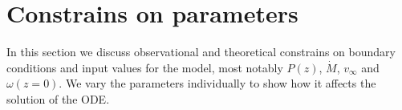 \section{Constrains on parameters}
\label{sect:parameters}
In this section we discuss observational and theoretical constrains on boundary conditions and input values for the model, most notably $P(z)$, $\dot M$, $v_\infty$ and $\omega(z=0)$. We vary the parameters individually to show how it affects the solution of the ODE.
